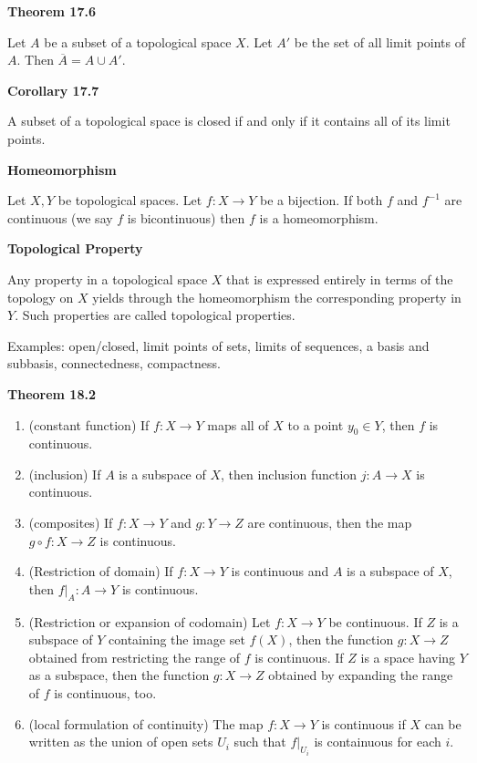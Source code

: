 \documentclass{article}
\newcommand{\inv}{^{-1}}
\begin{document}
\medskip\noindent\textbf{Theorem 17.6}

    Let $A$ be a subset of a topological space $X$.
    Let $A'$ be the set of all limit points of $A$.
    Then $\overline A = A \cup A'$.

\medskip\noindent\textbf{Corollary 17.7}

    A subset of a topological space is closed if and only if it contains all of its limit points.

\medskip\noindent\textbf{Homeomorphism}

    Let $X,Y$ be topological spaces. Let $f: X \to Y$ be a bijection. If both $f$ and $f\inv$ are continuous (we say $f$ is bicontinuous) then $f$ is a homeomorphism.

\medskip\noindent\textbf{Topological Property}

    Any property in a topological space $X$ that is expressed entirely in terms of the topology on $X$ yields through the homeomorphism the corresponding property in $Y$. Such properties are called topological properties.

    Examples: open/closed, limit points of sets, limits of sequences, a basis and subbasis, connectedness, compactness.

\medskip\noindent\textbf{Theorem 18.2}

    \begin{enumerate}
        \item (constant function) If $f: X \to Y$ maps all of $X$ to a point $y_0 \in Y$, then $f$ is continuous.
        \item (inclusion) If $A$ is a subspace of $X$, then inclusion function $j: A \to X$ is continuous.
        \item (composites) If $f: X \to Y$ and $g: Y \to Z$ are continuous, then the map $g \circ f: X \to Z$ is continuous.
        \item (Restriction of domain) If $f: X \to Y$ is continuous and $A$ is a subspace of $X$, then $f|_A: A \to Y$ is continuous.
        \item (Restriction or expansion of codomain) Let $f: X \to Y$ be continuous. If $Z$ is a subspace of $Y$ containing the image set $f(X)$, then the function $g: X \to Z$ obtained from restricting the range of $f$ is continuous.
        If $Z$ is a space having $Y$ as a subspace, then the function $g: X \to Z$ obtained by expanding the range of $f$ is continuous, too.
        \item (local formulation of continuity) The map $f: X \to Y$ is continuous if $X$ can be written as the union of open sets $U_i$ such that $f|_{U_i}$ is containuous for each $i$.
    \end{enumerate}
\end{document}
